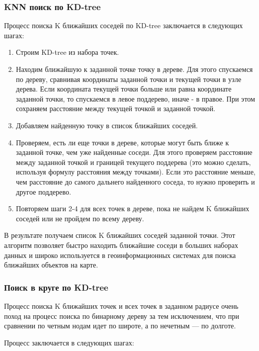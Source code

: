 \subsubsection{KNN поиск по KD-tree}

Процесс поиска K ближайших соседей по KD-tree заключается в следующих шагах:

\begin{enumerate}
    \item Строим KD-tree из набора точек.
    \item Находим ближайшую к заданной точке точку в дереве. Для этого спускаемся по дереву, сравнивая координаты заданной точки и текущей точки в узле дерева. Если координата текущей точки больше или равна координате заданной точки, то спускаемся в левое поддерево, иначе - в правое. При этом сохраняем расстояние между текущей точкой и заданной точкой.
    \item Добавляем найденную точку в список ближайших соседей.
    \item Проверяем, есть ли еще точки в дереве, которые могут быть ближе к заданной точке, чем уже найденные соседи. Для этого проверяем расстояние между заданной точкой и границей текущего поддерева (это можно сделать, используя формулу расстояния между точками). Если это расстояние меньше, чем расстояние до самого дальнего найденного соседа, то нужно проверить и другое поддерево.
    \item Повторяем шаги 2-4 для всех точек в дереве, пока не найдем K ближайших соседей или не пройдем по всему дереву.
\end{enumerate}

В результате получаем список K ближайших соседей заданной точки. Этот алгоритм позволяет быстро находить ближайшие соседи в больших наборах данных и широко используется в геоинформационных системах для поиска ближайших объектов на карте.

\subsubsection{Поиск в круге по KD-tree}
Процесс поиска K ближайших точек и всех точек в заданном радиусе очень поход на процесс поиска по бинарному дереву за тем исключением, что при сравнении по четным нодам идет по широте, а по нечетным — по долготе.

Процесс заключается в следующих шагах:

